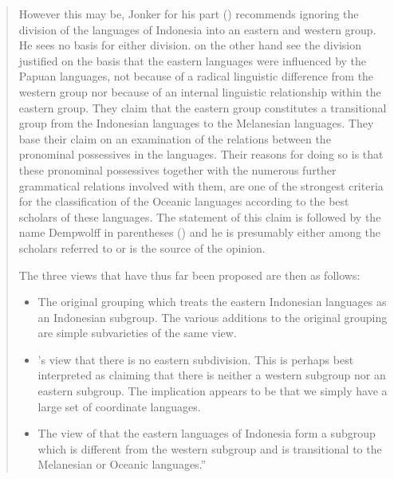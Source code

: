 \begin{quote}
	However this may be,
	Jonker for his part (\citeyear[263]{Jonker1914}) recommends ignoring the division
	of the languages of Indonesia into an eastern and western group.
	He sees no basis for either division.
	\citet[884]{KanskiKasprusch1931} on the other hand see the \citeauthor{Brandes1884}
	division justified on the basis that the eastern languages were influenced by the Papuan languages,
	not because of a radical linguistic difference from the western group
	nor because of an internal linguistic relationship within the eastern group.
	They claim that the eastern group constitutes a transitional group from the Indonesian languages to the Melanesian languages.
	They base their claim on an examination of the relations between the pronominal possessives in the languages.
	Their reasons for doing so is that these pronominal possessives together
	with the numerous further grammatical relations involved with them,
	are one of the strongest criteria for the classification of the
	Oceanic languages according to the best scholars of these languages.
	The statement of this claim is followed by the name Dempwolff in parentheses (\citeyear[884]{KanskiKasprusch1931})
	and he is presumably either among the scholars referred to or is the source of the opinion.

	The three views that have thus far been proposed are then as follows:
	
	\begin{itemize}
		\item[1)]{The original \citeauthor{Brandes1884} grouping which
							treats the eastern Indonesian languages as an Indonesian subgroup.
							The various additions to the original \citeauthor{Brandes1884} grouping are simple subvarieties of the same view.}
		\item[2)]{\citeauthor{Jonker1914}’s view that there is no eastern subdivision.
							This is perhaps best interpreted as claiming that
							there is neither a western subgroup nor an eastern subgroup.
							The implication appears to be that we simply have a large set of coordinate languages.} 
		\item[3)]{The view of \citeauthor{KanskiKasprusch1931} that the eastern languages of Indonesia
							form a subgroup which is different from the western subgroup
							and is transitional to the Melanesian or Oceanic languages.}'' \citep[235f]{Dyen1978b}
	\end{itemize}

\end{quote}

